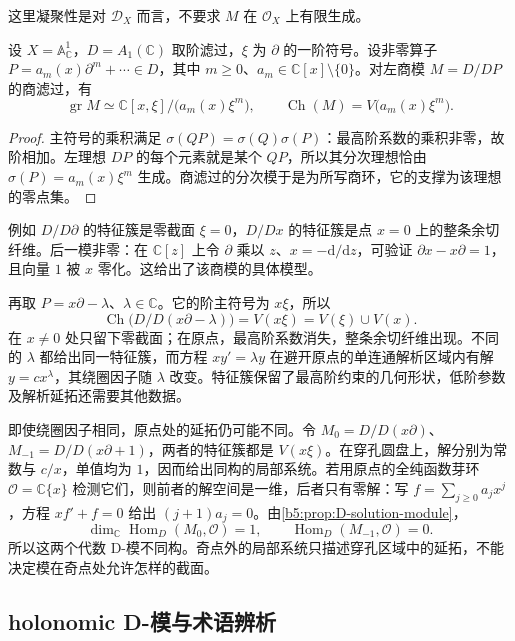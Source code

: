 这里凝聚性是对 \(\mathcal D_X\) 而言，不要求 \(M\) 在 \(\mathcal O_X\) 上有限生成。

\begin{proposition}\label{b5:prop:D-principal-characteristic}
	设 \(X=\mathbb A^1_{\mathbb C}\)，\(D=A_1(\mathbb C)\) 取阶滤过，\(\xi\) 为 \(\partial\) 的一阶符号。设非零算子 \(P=a_m(x)\partial^m+\cdots\in D\)，其中 \(m\ge0\)、\(a_m\in\mathbb C[x]\setminus\{0\}\)。对左商模 \(M=D/DP\) 的商滤过，有
	\[
		\operatorname{gr}M\simeq\mathbb C[x,\xi]/\bigl(a_m(x)\xi^m\bigr), \qquad \operatorname{Ch}(M)=V\bigl(a_m(x)\xi^m\bigr).
	\]
\end{proposition}
\begin{proof}
	主符号的乘积满足 \(\sigma(QP)=\sigma(Q)\sigma(P)\)：最高阶系数的乘积非零，故阶相加。左理想 \(DP\) 的每个元素就是某个 \(QP\)，所以其分次理想恰由 \(\sigma(P)=a_m(x)\xi^m\) 生成。商滤过的分次模于是为所写商环，它的支撑为该理想的零点集。
\end{proof}

例如 \(D/D\partial\) 的特征簇是零截面 \(\xi=0\)，\(D/Dx\) 的特征簇是点 \(x=0\) 上的整条余切纤维。后一模非零：在 \(\mathbb C[z]\) 上令 \(\partial\) 乘以 \(z\)、\(x=-\mathrm{d}/\mathrm{d}z\)，可验证 \(\partial x-x\partial=1\)，且向量 \(1\) 被 \(x\) 零化。这给出了该商模的具体模型。

\ProseParagraphBreak
再取 \(P=x\partial-\lambda\)、\(\lambda\in\mathbb C\)。它的阶主符号为 \(x\xi\)，所以
\[
	\operatorname{Ch}\bigl(D/D(x\partial-\lambda)\bigr) =V(x\xi)=V(\xi)\cup V(x).
\]
在 \(x\ne0\) 处只留下零截面；在原点，最高阶系数消失，整条余切纤维出现。不同的 \(\lambda\) 都给出同一特征簇，而方程 \(xy'=\lambda y\) 在避开原点的单连通解析区域内有解 \(y=cx^\lambda\)，其绕圈因子随 \(\lambda\) 改变。特征簇保留了最高阶约束的几何形状，低阶参数及解析延拓还需要其他数据。

\ProseParagraphBreak
即使绕圈因子相同，原点处的延拓仍可能不同。令 \(M_0=D/D(x\partial)\)、\(M_{-1}=D/D(x\partial+1)\)，两者的特征簇都是 \(V(x\xi)\)。在穿孔圆盘上，解分别为常数与 \(c/x\)，单值均为 \(1\)，因而给出同构的局部系统。若用原点的全纯函数芽环 \(\mathcal O=\mathbb C\{x\}\) 检测它们，则前者的解空间是一维，后者只有零解：写 \(f=\sum_{j\ge0}a_jx^j\)，方程 \(xf'+f=0\) 给出 \((j+1)a_j=0\)。由\cref{b5:prop:D-solution-module}，
\[
	\dim_{\mathbb C}\operatorname{Hom}_D(M_0,\mathcal O)=1, \qquad \operatorname{Hom}_D(M_{-1},\mathcal O)=0.
\]
所以这两个代数 D-模不同构。奇点外的局部系统只描述穿孔区域中的延拓，不能决定模在奇点处允许怎样的截面。

\subsection{holonomic D-模与术语辨析}
\label{b5:subsec:D01:04}

